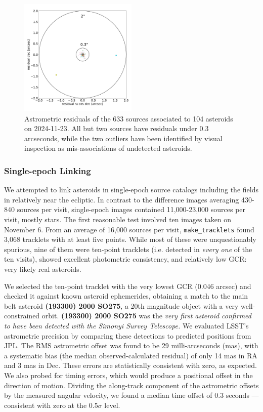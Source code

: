 \begin{figure}
  \includegraphics[width=0.5\textwidth]{sso_figures/sso_residuals.pdf}
  \caption{Astrometric residuals of the 633 sources associated to 104 asteroids on 2024-11-23. All but two sources have residuals under 0.3 arcseconds, while the two outliers have been identified by visual inspection as mis-associations of undetected asteroids.}
  \label{fig:solar_system_residuals}
\end{figure}

\subsubsection{Single-epoch Linking}
\label{sec:linking}

We attempted to link asteroids in single-epoch source catalogs including the fields in  relatively near the ecliptic. In contrast to the difference images averaging 430-840 sources per visit, single-epoch images contained 11,000-23,000 sources per visit, mostly stars. The first reasonable test involved ten images taken on November 6. From an average of 16,000 sources per visit, {\tt make\_tracklets} found 3,068 tracklets with at least five points. While most of these were unquestionably spurious, nine of them were ten-point tracklets (i.e. detected in {\em every one} of the ten visits), showed excellent photometric consistency, and relatively low GCR: very likely real asteroids.

We selected the ten-point tracklet with the very lowest GCR (0.046 arcsec) and checked it against known asteroid ephemerides, obtaining a match to the main belt asteroid \textbf{(193300) 2000 SO275}, a 20th magnitude object with a very well-constrained orbit. \textbf{(193300) 2000 SO275} was the {\em very first asteroid confirmed to have been detected with the Simonyi Survey Telescope.} We evaluated LSST's astrometric precision by comparing these detections to predicted positions from JPL. The RMS astrometric offset was found to be 29 milli-arcseconds (mas), with a systematic bias (the median observed-calculated residual) of only 14 mas in RA and 3 mas in Dec. These errors are statistically consistent with zero, as expected. We also probed for timing errors, which would produce a positional offset in the direction of motion. Dividing the along-track component of the astrometric offsets by the measured angular velocity, we found a median time offset of 0.3 seconds --- consistent with zero at the 0.5$\sigma$ level.

